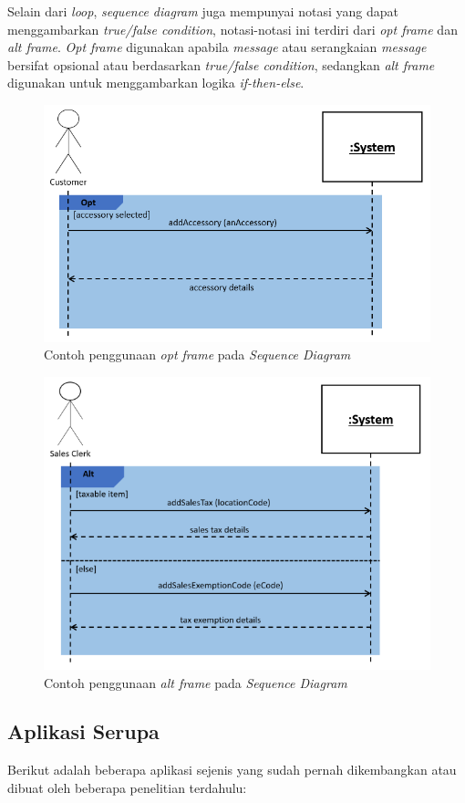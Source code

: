 \documentclass[a4paper]{article}
\newcommand{\subbab}[1]{%
    \subsection{#1}%
    \setcounter{figure}{0}
    \setcounter{table}{0}
}
\begin{document}
\begin{enumerate}
    Selain dari \textit{loop}, \textit{sequence diagram} juga mempunyai notasi yang dapat menggambarkan \textit{true/false condition}, notasi-notasi ini terdiri dari \textit{opt frame} dan \textit{alt frame}. \textit{Opt frame} digunakan apabila \textit{message} atau serangkaian \textit{message} bersifat opsional atau berdasarkan \textit{true/false condition}, sedangkan \textit{alt frame} digunakan untuk menggambarkan logika \textit{if-then-else}\autocite[139-146]{uml-satzinger}.
    \newpage
    \begin{figure}[h]
        \centering
        \includegraphics[scale=0.5]{images/uml satzinger/sequence diagram/opt frame example.png}
        \caption{Contoh penggunaan \textit{opt frame} pada \textit{Sequence Diagram}}
    \end{figure}

    \begin{figure}[h]
        \centering
        \includegraphics[scale=0.5]{images/uml satzinger/sequence diagram/alt frame example.png}
        \caption{Contoh penggunaan \textit{alt frame} pada \textit{Sequence Diagram}}
    \end{figure}
    
\end{enumerate}
\subbab{Aplikasi Serupa}
Berikut adalah beberapa aplikasi sejenis yang sudah pernah dikembangkan atau dibuat oleh beberapa penelitian terdahulu:
\end{document}
